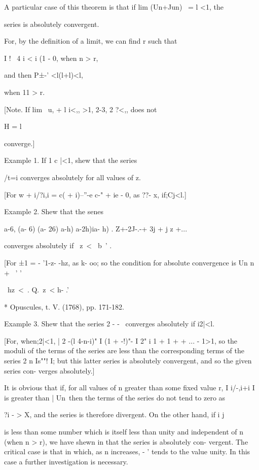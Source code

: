 A particular case of this theorem is that if lim (Un+Jun) \ = l <1,
the

series is absolutely convergent.

For, by the definition of a limit, we can find r such that

I ! \ 4 i < i (1 - 0, when n > r,

and then P±-' <l(l+l)<l,

when 11 > r.

[Note. If lim \ u, + l i<,, >1, %
2-3, 2 ?<,, does not

H = l

converge.]

Example 1. If 1 c |<1, shew that the series

/t=i converges absolutely for all values of z.

[For w + i/?i,i = c( + i)--''-e c-" + ie - 0, as ??- x, if;Cj<l.]

Example 2. Shew that the senes

a-6, (a- 6) (a- 26) a-h) a-2h)ia- h) . Z+-2J-.-+ 3j + j z +...

converges absolutely if \ z\ < \ b~' .

[For ±1 = - '1-z- -hz, as k- oo; so the condition for absolute
convergence is Un n + \ ' '

\ hz\ < \,. Q.\ z\ < h- .'\

* Opuscules, t. V. (1768), pp. 171-182.

%
%

Example 3. Shew that the series 2 - - \, converges absolutely if
i2|<l.

[For, when;2|<1, | 2 -(l 4-n-i)" I (1 + -!)"- I 2" i 1 + 1 + + ... -
1>1, so the moduli of the terms of the series are less than the
corresponding terms of the series 2 n Is""! I; but this latter series
is absolutely convergent, and so the given series con- verges
absolutely.]


It is obvious that if, for all values of n greater than some fixed
value r, I i/-,i+i I is greater than | Un\, then the terms of the
series do not tend to zero as

?i - > X, and the series is therefore divergent. On the other hand,
if i j

is less than some number which is itself less than unity and
independent of n (when n > r), we have shewn in  that the series
is absolutely con- vergent. The critical case is that in which, as n
increases, - ' tends to the value unity. In this case a further
investigation is necessary.

